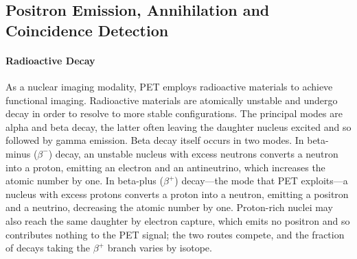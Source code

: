 \subsection{Positron Emission, Annihilation and Coincidence Detection}
\label{sec:annihilation}

\paragraph{Radioactive Decay}
As a nuclear imaging modality, PET employs radioactive materials to achieve functional imaging. Radioactive materials are atomically unstable and undergo decay in order to resolve to more stable configurations.
The principal modes are alpha and beta decay, the latter often leaving the daughter nucleus excited and so followed by gamma emission.
Beta decay itself occurs in two modes.
In beta-minus ($\beta^-$) decay, an unstable nucleus with excess neutrons converts a neutron into a proton, emitting an electron and an antineutrino, which increases the atomic number by one.
In beta-plus ($\beta^+$) decay---the mode that PET exploits---a nucleus with excess protons converts a proton into a neutron, emitting a positron and a neutrino, decreasing the atomic number by one.
Proton-rich nuclei may also reach the same daughter by electron capture, which emits no positron and so contributes nothing to the PET signal; the two routes compete, and the fraction of decays taking the $\beta^+$ branch varies by isotope.

